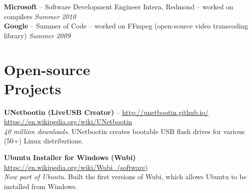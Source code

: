 \documentclass[margin,line]{resume}
\begin{document}
\begin{resume}
\vspace{-6mm}

\textbf{Microsoft} -- Software Development Engineer Intern, Redmond -- worked on compilers \hfill \textsl{Summer 2010}\\
\textbf{Google} -- Summer of Code -- worked on FFmpeg (open-source video transcoding library) \hfill \textsl{Summer 2009}\\



\vspace{-6mm}

\section{\mysidestyle Open-source\\Projects}

\textbf{UNetbootin (LiveUSB Creator)} -- \url{http://unetbootin.github.io/} \hfill \url{https://en.wikipedia.org/wiki/UNetbootin}\\ %
\emph{40 million downloads}. UNetbootin creates bootable USB flash drives for various (50+) Linux distributions.\\ %

\vspace{-6.5mm}

\textbf{Ubuntu Installer for Windows (Wubi)} \hfill \url{https://en.wikipedia.org/wiki/Wubi_(software)}\\ %
\emph{Now part of Ubuntu}. Built the first versions of Wubi, which allows Ubuntu to be installed from Windows.\\ %


\end{resume}
\end{document}
